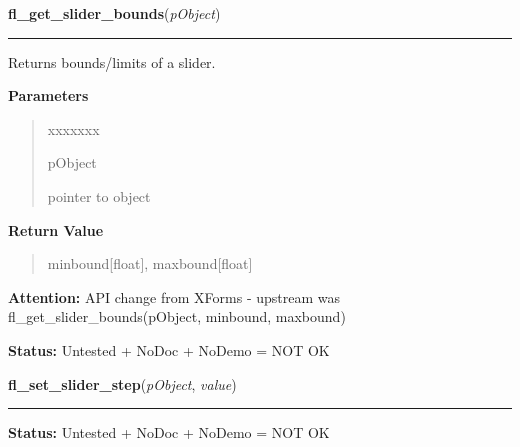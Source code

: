 \hspace{.8\funcindent}\begin{boxedminipage}{\funcwidth}

    \raggedright \textbf{fl\_get\_slider\_bounds}(\textit{pObject})

    \vspace{-1.5ex}

    \rule{\textwidth}{0.5\fboxrule}
\setlength{\parskip}{2ex}
    Returns bounds/limits of a slider.

\setlength{\parskip}{1ex}
      \textbf{Parameters}
      \vspace{-1ex}

      \begin{quote}
        \begin{Ventry}{xxxxxxx}

          \item[pObject]

          pointer to object

        \end{Ventry}

      \end{quote}

      \textbf{Return Value}
    \vspace{-1ex}

      \begin{quote}
      minbound[float], maxbound[float]

      \end{quote}

\textbf{Attention:} API change from XForms - upstream was fl\_get\_slider\_bounds(pObject, 
minbound, maxbound)



\textbf{Status:} Untested + NoDoc + NoDemo = NOT OK



    \end{boxedminipage}

    \label{xformslib:library:fl_set_slider_step}

    \vspace{0.5ex}

\hspace{.8\funcindent}\begin{boxedminipage}{\funcwidth}

    \raggedright \textbf{fl\_set\_slider\_step}(\textit{pObject}, \textit{value})

    \vspace{-1.5ex}

    \rule{\textwidth}{0.5\fboxrule}
\setlength{\parskip}{2ex}
\setlength{\parskip}{1ex}
\textbf{Status:} Untested + NoDoc + NoDemo = NOT OK



    \end{boxedminipage}

